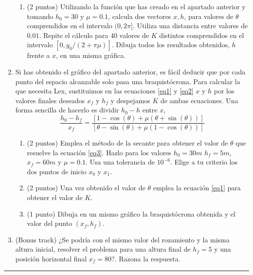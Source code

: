 \begin{enumerate}
\begin{enumerate}
		\item (2 puntos) Utilizando la función que has creado en el apartado anterior y tomando $h_0=30$ y $\mu = 0.1$, calcula dos vectores $x,h$, para valores de $\theta$ comprendidos en el intervalo $(0,2\pi]$. Utiliza una distancia entre valores de $0.01$. Repite el cálculo para 40 valores de $K$ distintos comprendidos en el intervalo $[0, y_0/(2+\pi\mu)]$. Dibuja todos los resultados obtenidos, $h$ frente a $x$, en una misma gráfica.
	\end{enumerate}
	\item Si has obtenido el gráfico del apartado anterior, es fácil deducir que por cada punto del espacio alcanzable solo pasa una braquistócrona. Para calcular la que necesita Lex, sustituimos en las ecuaciones \ref{eq1} y \ref{eq2} $x$ y $h$ por los valores finales deseados $x_f$ y $h_f$ y despejamos $K$ de ambas ecuaciones. Una forma sencilla de hacerlo es dividir $h_0-h$ entre $x$,
	\begin{equation}\label{eq3}
		\frac{h_0-h_f}{x_f} = \frac{[1-\cos(\theta) + \mu(\theta+\sin(\theta))]}
		{[\theta-\sin(\theta) + \mu(1-\cos(\theta))]}
	\end{equation}
	\begin{enumerate}
		\item (2 puntos) Emplea el método de la secante para obtener el valor de $\theta$ que resuelve la ecuación \ref{eq3}. Hazlo para los valores $h_0=30m$ $h_f=5m$, $x_f=60m$ y $\mu=0.1$. Usa una tolerancia de $10^{-6}$. Elige a tu criterio los dos puntos de inicio $x_0$ y $x_1$. 
		
		\item (2 puntos) Una vez obtenido el valor de $\theta$ emplea la ecuación \ref{eq1} para obtener el valor de $K$.
		
		\item (1 punto) Dibuja en un mismo gráfico la braquistócrona obtenida y el valor del punto $(x_f,h_f)$.
		
	\end{enumerate}
	
	\item (Bonus track) ¿Se podría con el mismo valor del rozamiento y la misma altura inicial, resolver el problema para una altura final de $h_f=5$ y una posición horizontal final $x_f = 80$?. Razona la respuesta.
\end{enumerate}




\noindent\rule{\textwidth}{0.4pt}
